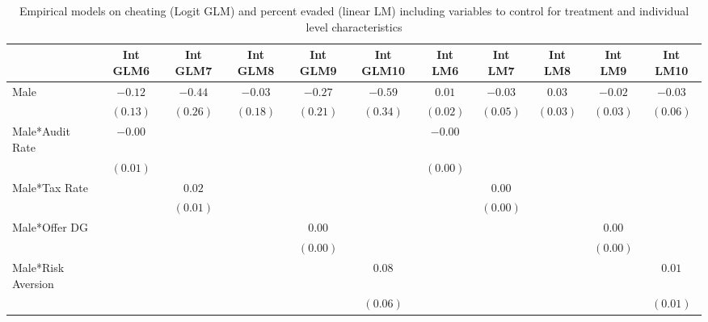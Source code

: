 
\begin{table}
\caption{Empirical models on cheating (Logit GLM) and percent evaded (linear LM) including variables
       to control for treatment and individual level characteristics}
\begin{center}
\begin{tabular}{l c c c c c c c c c c }
\hline
 & Int GLM6 &  Int GLM7  & Int GLM8 & Int GLM9 & Int GLM10 & Int LM6 &  Int LM7  & Int LM8 & Int LM9 & Int LM10 \\
\hline
Male               & $-0.12$       & $-0.44$       & $-0.03$       & $-0.27$       & $-0.59$       & $0.01$        & $-0.03$       & $0.03$        & $-0.02$       & $-0.03$       \\
                   & $(0.13)$      & $(0.26)$      & $(0.18)$      & $(0.21)$      & $(0.34)$      & $(0.02)$      & $(0.05)$      & $(0.03)$      & $(0.03)$      & $(0.06)$      \\
Male*Audit Rate    & $-0.00$       &               &               &               &               & $-0.00$       &               &               &               &               \\
                   & $(0.01)$      &               &               &               &               & $(0.00)$      &               &               &               &               \\
Male*Tax Rate      &               & $0.02$        &               &               &               &               & $0.00$        &               &               &               \\
                   &               & $(0.01)$      &               &               &               &               & $(0.00)$      &               &               &               \\
Male*Offer DG      &               &               &               & $0.00$        &               &               &               &               & $0.00$        &               \\
                   &               &               &               & $(0.00)$      &               &               &               &               & $(0.00)$      &               \\
Male*Risk Aversion &               &               &               &               & $0.08$        &               &               &               &               & $0.01$        \\
                   &               &               &               &               & $(0.06)$      &               &               &               &               & $(0.01)$      \\

\end{tabular}
\end{center}
\end{table}
